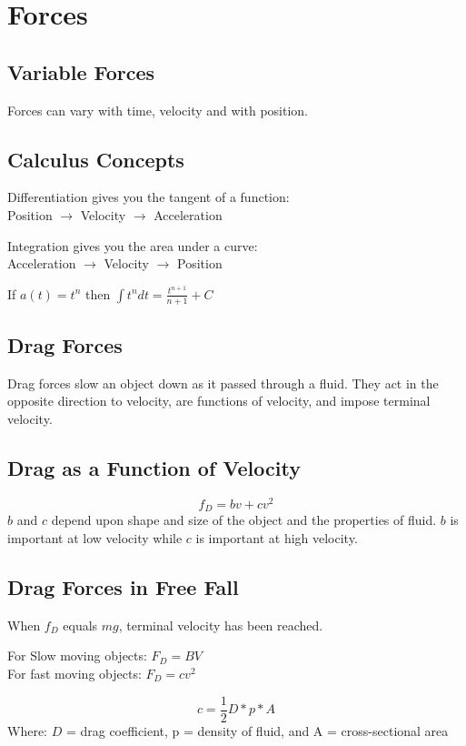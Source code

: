\section{Forces}

\subsection{Variable Forces}
Forces can vary with time, velocity and with position.

\subsection{Calculus Concepts}
\begin{center}
Differentiation gives you the tangent of a function:\\ Position $\rightarrow$ Velocity $\rightarrow$ Acceleration
\end{center}

\begin{center}
Integration gives you the area under a curve:\\ Acceleration $\rightarrow$ Velocity $\rightarrow$ Position
\end{center}

\begin{center}
If $a(t)=t^n$ then $\int t^n dt = \frac{t^{n+1}}{n+1}+C$
\end{center}

\subsection{Drag Forces}
Drag forces slow an object down as it passed through a fluid. They act in the opposite direction to velocity, are functions of velocity, and impose terminal velocity. 

\subsection{Drag as a Function of Velocity}
\[f_D=bv+cv^2\]
$b$ and $c$ depend upon shape and size of the object and the properties of fluid. $b$ is important at low velocity while $c$ is important at high velocity.

\subsection{Drag Forces in Free Fall}
When $f_D$ equals $mg$, terminal velocity has been reached.\\
\begin{center}	
For Slow moving objects: $F_D=BV$\\
For fast moving objects: $F_D=cv^2$\\
\end{center}

\[c=\frac{1}{2}D*p*A\]
Where: $D$ = drag coefficient, p = density of fluid, and A = cross-sectional area